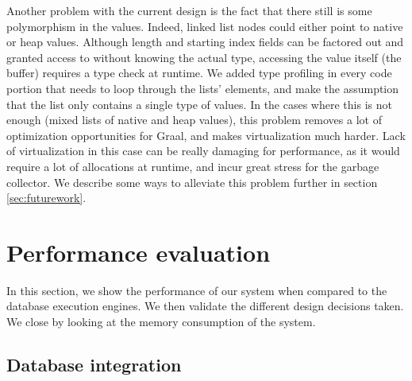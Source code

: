 \documentclass[twoside,11pt,a4paper]{article}
\newcommand{\startsection}[1]{
	\cleardoublepage
	\section{#1}
	\thispagestyle{basic}
}
\begin{document}
Another problem with the current design is the fact that there still is some polymorphism in the values. Indeed, linked list nodes could either point to native or heap values. Although length and starting index fields can be factored out and granted access to without knowing the actual type, accessing the value itself (the buffer) requires a type check at runtime. We added type profiling in every code portion that needs to loop through the lists' elements, and make the assumption that the list only contains a single type of values. In the cases where this is not enough (mixed lists of native and heap values), this problem removes a lot of optimization opportunities for Graal, and makes virtualization much harder. Lack of virtualization in this case can be really damaging for performance, as it would require a lot of allocations at runtime, and incur great stress for the garbage collector. We describe some ways to alleviate this problem further in section \ref{sec:futurework}.

\startsection{Performance evaluation}
\label{sec:benchmarks}

In this section, we show the performance of our system when compared to the database execution engines. We then validate the different design decisions taken. We close by looking at the memory consumption of the system.


\subsection{Database integration}
\end{document}
